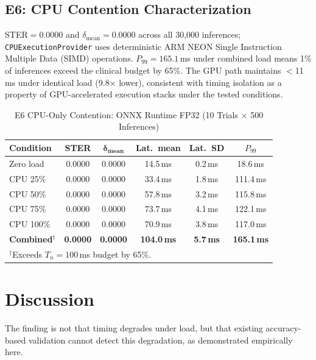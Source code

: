 \documentclass[journal,twoside,9pt]{IEEEtran}
\begin{document}
\subsection{E6: CPU Contention Characterization}

STER$=0.0000$ and $\delta_{\text{mean}}=0.0000$ across all 30,000 inferences;
\texttt{CPUExecutionProvider} uses deterministic ARM NEON Single Instruction Multiple
Data (SIMD) operations. $P_{99}=165.1$\,ms under combined load means 1\% of
inferences exceed the clinical budget by 65\%. The GPU path maintains $<$11\,ms
under identical load (9.8$\times$ lower), consistent with timing isolation as a
property of GPU-accelerated execution stacks under the tested conditions.

\begin{table}[t]
  \caption{E6 CPU-Only Contention: ONNX Runtime FP32 (10 Trials $\times$ 500 Inferences)}
  \label{tab:e6}
  \centering
  \footnotesize
  \setlength{\tabcolsep}{3pt}
  \begin{tabular}{@{}lccccc@{}}
    \toprule
    \textbf{Condition} & \textbf{STER} & $\boldsymbol{\delta_{\text{mean}}}$ & \textbf{Lat.\ mean} & \textbf{Lat.\ SD} & \textbf{$P_{99}$} \\
    \midrule
    Zero load & 0.0000 & 0.0000 & 14.5\,ms & 0.2\,ms & 18.6\,ms \\
    CPU 25\%  & 0.0000 & 0.0000 & 33.4\,ms & 1.8\,ms & 111.4\,ms \\
    CPU 50\%  & 0.0000 & 0.0000 & 57.8\,ms & 3.2\,ms & 115.8\,ms \\
    CPU 75\%  & 0.0000 & 0.0000 & 73.7\,ms & 4.1\,ms & 122.1\,ms \\
    CPU 100\% & 0.0000 & 0.0000 & 70.9\,ms & 3.8\,ms & 117.0\,ms \\
    \textbf{Combined}$^\dagger$ & \textbf{0.0000} & \textbf{0.0000} & \textbf{104.0\,ms} & \textbf{5.7\,ms} & \textbf{165.1\,ms} \\
    \bottomrule
    \multicolumn{6}{l}{\scriptsize $^\dagger$Exceeds $T_n=100$\,ms budget by 65\%.}
  \end{tabular}
\end{table}

\section{Discussion}

The finding is not that timing degrades under load, but that existing accuracy-based
validation cannot detect this degradation, as demonstrated empirically here.
\end{document}
